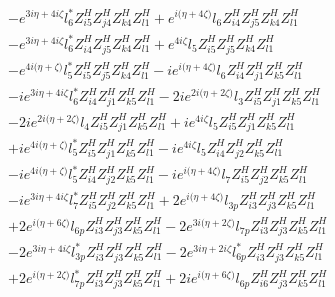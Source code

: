 \begin{align}
 &- e^{3 i \eta +4 i \zeta } l_6^* Z_{{i 5}}^{H} Z_{{j 4}}^{H} Z_{{k 4}}^{H} Z_{{l 1}}^{H} +e^{i \Big(\eta +4 \zeta \Big)} l_6 Z_{{i 4}}^{H} Z_{{j 5}}^{H} Z_{{k 4}}^{H} Z_{{l 1}}^{H} \nonumber \\ 
 &- e^{3 i \eta +4 i \zeta } l_6^* Z_{{i 4}}^{H} Z_{{j 5}}^{H} Z_{{k 4}}^{H} Z_{{l 1}}^{H} +e^{4 i \zeta } l_5 Z_{{i 5}}^{H} Z_{{j 5}}^{H} Z_{{k 4}}^{H} Z_{{l 1}}^{H} \nonumber \\ 
 &- e^{4 i \Big(\eta +\zeta \Big)} l_5^* Z_{{i 5}}^{H} Z_{{j 5}}^{H} Z_{{k 4}}^{H} Z_{{l 1}}^{H} -i e^{i \Big(\eta +4 \zeta \Big)} l_6 Z_{{i 4}}^{H} Z_{{j 1}}^{H} Z_{{k 5}}^{H} Z_{{l 1}}^{H} \nonumber \\ 
 &-i e^{3 i \eta +4 i \zeta } l_6^* Z_{{i 4}}^{H} Z_{{j 1}}^{H} Z_{{k 5}}^{H} Z_{{l 1}}^{H} -2 i e^{2 i \Big(\eta +2 \zeta \Big)} l_3 Z_{{i 5}}^{H} Z_{{j 1}}^{H} Z_{{k 5}}^{H} Z_{{l 1}}^{H} \nonumber \\ 
 &-2 i e^{2 i \Big(\eta +2 \zeta \Big)} l_4 Z_{{i 5}}^{H} Z_{{j 1}}^{H} Z_{{k 5}}^{H} Z_{{l 1}}^{H} +i e^{4 i \zeta } l_5 Z_{{i 5}}^{H} Z_{{j 1}}^{H} Z_{{k 5}}^{H} Z_{{l 1}}^{H} \nonumber \\ 
 &+i e^{4 i \Big(\eta +\zeta \Big)} l_5^* Z_{{i 5}}^{H} Z_{{j 1}}^{H} Z_{{k 5}}^{H} Z_{{l 1}}^{H} -i e^{4 i \zeta } l_5 Z_{{i 4}}^{H} Z_{{j 2}}^{H} Z_{{k 5}}^{H} Z_{{l 1}}^{H} \nonumber \\ 
 &-i e^{4 i \Big(\eta +\zeta \Big)} l_5^* Z_{{i 4}}^{H} Z_{{j 2}}^{H} Z_{{k 5}}^{H} Z_{{l 1}}^{H} -i e^{i \Big(\eta +4 \zeta \Big)} l_7 Z_{{i 5}}^{H} Z_{{j 2}}^{H} Z_{{k 5}}^{H} Z_{{l 1}}^{H} \nonumber \\ 
 &-i e^{3 i \eta +4 i \zeta } l_7^* Z_{{i 5}}^{H} Z_{{j 2}}^{H} Z_{{k 5}}^{H} Z_{{l 1}}^{H} +2 e^{i \Big(\eta +4 \zeta \Big)} l_{3p} Z_{{i 3}}^{H} Z_{{j 3}}^{H} Z_{{k 5}}^{H} Z_{{l 1}}^{H} \nonumber \\ 
 &+2 e^{i \Big(\eta +6 \zeta \Big)} l_{6p} Z_{{i 3}}^{H} Z_{{j 3}}^{H} Z_{{k 5}}^{H} Z_{{l 1}}^{H} -2 e^{3 i \Big(\eta +2 \zeta \Big)} l_{7p} Z_{{i 3}}^{H} Z_{{j 3}}^{H} Z_{{k 5}}^{H} Z_{{l 1}}^{H} \nonumber \\ 
 &-2 e^{3 i \eta +4 i \zeta } l_{3p}^* Z_{{i 3}}^{H} Z_{{j 3}}^{H} Z_{{k 5}}^{H} Z_{{l 1}}^{H} -2 e^{3 i \eta +2 i \zeta } l_{6p}^* Z_{{i 3}}^{H} Z_{{j 3}}^{H} Z_{{k 5}}^{H} Z_{{l 1}}^{H} \nonumber \\ 
 &+2 e^{i \Big(\eta +2 \zeta \Big)} l_{7p}^* Z_{{i 3}}^{H} Z_{{j 3}}^{H} Z_{{k 5}}^{H} Z_{{l 1}}^{H} +2 i e^{i \Big(\eta +6 \zeta \Big)} l_{6p} Z_{{i 6}}^{H} Z_{{j 3}}^{H} Z_{{k 5}}^{H} Z_{{l 1}}^{H} \nonumber \\ 

\end{align}
